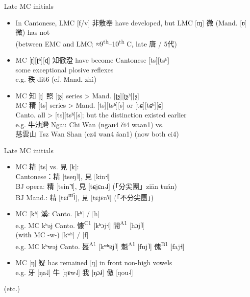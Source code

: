 \documentclass{beamer}
\begin{document}
\begin{frame}[fragile]{Late MC initials}
\begin{itemize}
    \item In Cantonese, LMC [f/v] 非敷奉 have developed, but LMC [ɱ] 微 (Mand. [ʋ] 微) has not\\
    (between EMC and LMC; ≈9\textsuperscript{th}–10\textsuperscript{th} C, late 唐 / 5代)
    \item MC [ʈ][ʈʰ][ɖ] 知徹澄 have become Cantonese [ts][tsʰ]\\ some exceptional plosive reflexes\\ e.g. 秩 dit6 (cf. Mand. zhì) 
    \item MC 知 [ʈ] 照 [ʈʂ] series > Mand. [ʈʂ][ʈʂʰ][ʂ]\\ MC 精 [ts] series > Mand. [ts][tsʰ][s] or [tɕ][tɕʰ][ɕ]\\ Canto. all > [ts][tsʰ][s]; but the distinction existed earlier\\ e.g. 牛池灣 Ngau Chi Wan (ngau4 či4 waan1) vs.\\ 慈雲山 Tsz Wan Shan (cz4 wan4 šan1) (now both ci4)
\end{itemize}

\end{frame}

\begin{frame}[fragile]{Late MC initials}
\begin{itemize}
    \item MC 精 [ts] vs. 見 [k]:\\ 
    \quad Cantonese：精 [tseŋ˥], 見 [kin˧]\\
    \quad BJ opera: 精 [tsin˥˥˧], 見 [tɕjɛn˨˩˨] (「分尖團」ziān tuán)\\
    \quad BJ Mand.: 精 [tɕi\textsuperscript{ɯ̃}˥], 見 [tɕjɛn˥˨] (「不分尖團」)\\
    \item MC [kʰ] 溪: Canto. [kʰ] / [h]\\ \quad e.g. MC kʰəj Canto. 慷\textsuperscript{C1} [kʰɔj˧] 開\textsuperscript{A1} [hɔj˥]\\ (with MC -w-) [kʷʰ] / [f]\\ \quad e.g. MC kʰwəj Canto. 盔\textsuperscript{A1} [kʷʰɐj˥] 魁\textsuperscript{A1} [fuj˥] 傀\textsuperscript{B1} [faj˧]
    \item MC [ŋ] 疑 has remained [ŋ] in front non-high vowels\\
    \quad e.g. 牙 [ŋa˨˩] 牛 [ŋɐw˨˩] 我 [ŋɔ˩˧] 傲 [ŋou˨]
\end{itemize}
(etc.)\\
\end{frame}
\end{document}
